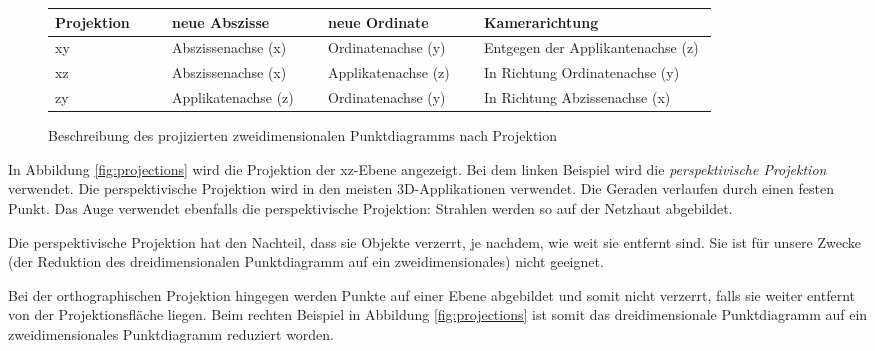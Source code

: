 \begin{figure}[H]
	\centering
	\begin{tabular}{ | m{0.15\linewidth} | m{0.2\linewidth} |m{0.2\linewidth} | m{0.3\linewidth} |}
		\hline
		\textbf{Projektion} & \textbf{neue Abszisse} & \textbf{neue Ordinate} & \textbf{Kamerarichtung}\\ \hline
		xy & Abszissenachse (x) & Ordinatenachse (y) & Entgegen der Applikantenachse (z) \\ \hline
		xz & Abszissenachse (x) & Applikatenachse (z) & In Richtung Ordinatenachse (y)\\ \hline
		zy & Applikatenachse (z) & Ordinatenachse (y) & In Richtung Abzissenachse (x) \\ \hline
	\end{tabular}
	\caption{Beschreibung des projizierten zweidimensionalen Punktdiagramms nach Projektion}
	\label{fig:3dtable}
\end{figure}

In Abbildung \ref{fig:projections} wird die Projektion der xz-Ebene angezeigt. Bei dem linken Beispiel wird die \textit{perspektivische Projektion} verwendet. Die perspektivische Projektion wird in den meisten 3D-Applikationen verwendet. Die Geraden verlaufen durch einen festen Punkt. Das Auge verwendet ebenfalls die perspektivische Projektion: Strahlen werden so auf der Netzhaut abgebildet.

Die perspektivische Projektion hat den Nachteil, dass sie Objekte verzerrt, je nachdem, wie weit sie entfernt sind. Sie ist für unsere Zwecke (der Reduktion des dreidimensionalen Punktdiagramm auf ein zweidimensionales) nicht geeignet.

Bei der orthographischen Projektion hingegen werden Punkte auf einer Ebene abgebildet und somit nicht verzerrt, falls sie weiter entfernt von der Projektionsfläche liegen. Beim rechten Beispiel in Abbildung \ref{fig:projections} ist somit das dreidimensionale Punktdiagramm auf ein zweidimensionales Punktdiagramm reduziert worden.

